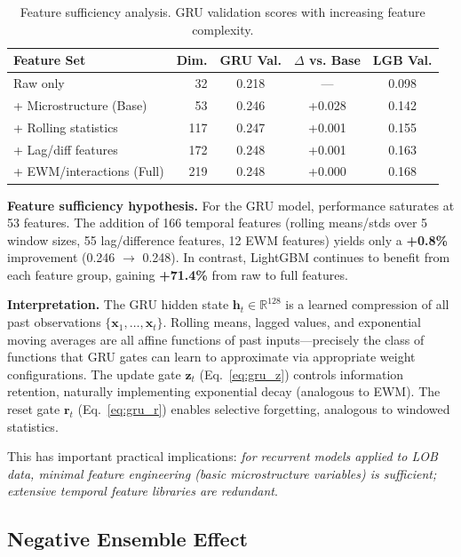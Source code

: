 \documentclass[11pt,a4paper]{article}
\newcommand{\R}{\mathbb{R}}
\newcommand{\bx}{\mathbf{x}}
\newcommand{\bh}{\mathbf{h}}
\begin{document}
\begin{table}[h]
\centering
\small
\caption{Feature sufficiency analysis. GRU validation scores with increasing feature complexity.}
\label{tab:feature_ablation}
\begin{tabular}{@{}lrccc@{}}
\toprule
\textbf{Feature Set} & \textbf{Dim.} & \textbf{GRU Val.} & \textbf{$\Delta$ vs. Base} & \textbf{LGB Val.} \\
\midrule
Raw only & 32 & 0.218 & --- & 0.098 \\
+ Microstructure (Base) & 53 & 0.246 & +0.028 & 0.142 \\
+ Rolling statistics & 117 & 0.247 & +0.001 & 0.155 \\
+ Lag/diff features & 172 & 0.248 & +0.001 & 0.163 \\
+ EWM/interactions (Full) & 219 & 0.248 & +0.000 & 0.168 \\
\bottomrule
\end{tabular}
\end{table}

\textbf{Feature sufficiency hypothesis.} For the GRU model, performance saturates at 53 features. The addition of 166 temporal features (rolling means/stds over 5 window sizes, 55 lag/difference features, 12 EWM features) yields only a \textbf{+0.8\%} improvement (0.246 $\to$ 0.248). In contrast, LightGBM continues to benefit from each feature group, gaining \textbf{+71.4\%} from raw to full features.

\textbf{Interpretation.} The GRU hidden state $\bh_t \in \R^{128}$ is a learned compression of all past observations $\{\bx_1, \ldots, \bx_t\}$. Rolling means, lagged values, and exponential moving averages are all affine functions of past inputs---precisely the class of functions that GRU gates can learn to approximate via appropriate weight configurations. The update gate $\mathbf{z}_t$ (Eq.~\ref{eq:gru_z}) controls information retention, naturally implementing exponential decay (analogous to EWM). The reset gate $\mathbf{r}_t$ (Eq.~\ref{eq:gru_r}) enables selective forgetting, analogous to windowed statistics.

This has important practical implications: \emph{for recurrent models applied to LOB data, minimal feature engineering (basic microstructure variables) is sufficient; extensive temporal feature libraries are redundant}.


\subsection{Negative Ensemble Effect}
\label{sec:ensemble}
\end{document}
